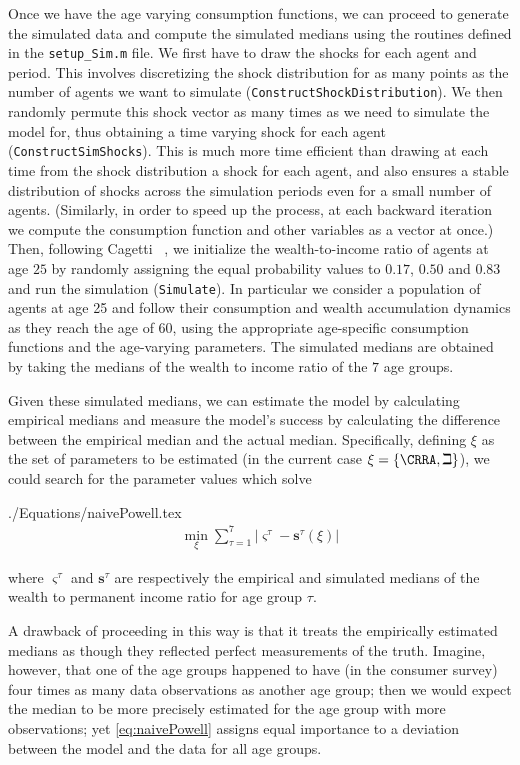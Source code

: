 \documentclass[titlepage]{\econtex}
\begin{document}
Once we have the age varying consumption functions, we can proceed to
generate the simulated data and compute the simulated medians using
the routines defined in the \texttt{setup\_Sim.m} file. We first have
to draw the shocks for each agent and period. This involves
discretizing the shock distribution for as many points as the number
of agents we want to simulate
(\texttt{ConstructShockDistribution}). We then randomly permute this
shock vector as many times as we need to simulate the model for, thus
obtaining a time varying shock for each agent
(\texttt{ConstructSimShocks}). This is much more time efficient than
drawing at each time from the shock distribution a shock for each
agent, and also ensures a stable distribution of shocks across the
simulation periods even for a small number of agents. (Similarly, in
order to speed up the process, at each backward iteration we compute
the consumption function and other variables as a vector at once.)
Then, following Cagetti ~\citeyearpar{cagettiWprofiles}, we
initialize the wealth-to-income ratio of agents at age $25$ by
randomly assigning the equal probability values to $0.17$, $0.50$ and
$0.83$ and run the simulation (\texttt{Simulate}). In particular we
consider a population of agents at age 25 and follow their consumption
and wealth accumulation dynamics as they reach the age of $60$, using
the appropriate age-specific consumption functions and the age-varying
parameters. The simulated medians are obtained by taking the medians
of the wealth to income ratio of the $7$ age groups.

Given these simulated medians, we can estimate the model by
calculating empirical medians and measure the model's success
by calculating the difference between the empirical median and the
actual median.  Specifically, defining $\xi$ as the set of parameters
to be estimated (in the current case $\xi =\{\CRRA ,{\beth}\}$), we could search for
the parameter values which solve
\begin{verbatimwrite}{./Equations/naivePowell.tex}
\begin{eqnarray}
  \min_{\xi} \sum_{\tau=1}^{7} |\varsigma^{\tau} -\mathbf{s}^{\tau}(\xi)|  \label{eq:naivePowell}
\end{eqnarray}
\end{verbatimwrite}

where $\varsigma^{\tau }$ and $\mathbf{s}^{\tau}$ are respectively the empirical and simulated medians of the wealth to permanent income ratio for age group $\tau $.

A drawback of proceeding in this way is that it treats the empirically
estimated medians as though they reflected perfect measurements of the
truth. Imagine, however, that one of the age groups happened to have
(in the consumer survey) four times as many data observations as
another age group; then we would expect the median to be more
precisely estimated for the age group with more observations; yet
\eqref{eq:naivePowell} assigns equal importance to a deviation between
the model and the data for all age groups.
\end{document}
